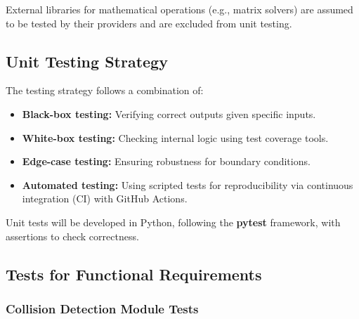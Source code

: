 \documentclass[12pt, titlepage]{article}
\begin{document}
External libraries for mathematical operations (e.g., matrix solvers) are assumed to be tested by their providers and are excluded from unit testing.

\subsection{Unit Testing Strategy}

The testing strategy follows a combination of:
\begin{itemize}
    \item \textbf{Black-box testing:} Verifying correct outputs given specific inputs.
    \item \textbf{White-box testing:} Checking internal logic using test coverage tools.
    \item \textbf{Edge-case testing:} Ensuring robustness for boundary conditions.
    \item \textbf{Automated testing:} Using scripted tests for reproducibility via continuous integration (CI) with GitHub Actions.
\end{itemize}

Unit tests will be developed in Python, following the \textbf{pytest} framework, with assertions to check correctness.


\subsection{Tests for Functional Requirements}

\subsubsection{Collision Detection Module Tests}
\end{document}
